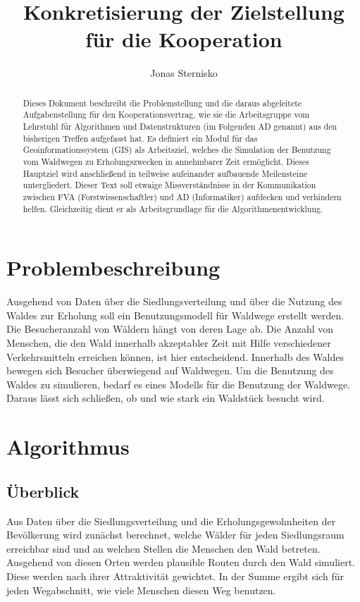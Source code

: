 \documentclass[parskip=half,german]{scrartcl}
\title{Konkretisierung der Zielstellung für die Kooperation}
\subtitle{}
\author{Jonas Sternisko}
\begin{document}
  \maketitle

  \begin{abstract}
Dieses Dokument beschreibt die Problemstellung und die daraus abgeleitete
Aufgabenstellung für den Kooperationsvertrag, wie sie die Arbeitsgruppe vom
Lehrstuhl für Algorithmen und Datenstrukturen (im Folgenden AD genannt) aus den
bisherigen Treffen aufgefasst hat. Es definiert ein Modul für das
Geoinformationssystem (GIS) als Arbeitsziel, welches die Simulation der
Benutzung vom Waldwegen zu Erholungszwecken in annehmbarer Zeit ermöglicht.
Dieses Hauptziel wird anschließend in teilweise aufeinander aufbauende
Meilensteine untergliedert.
Dieser Text soll etwaige Missverständnisse in der Kommunikation zwischen FVA
(Forstwissenschaftler) und AD (Informatiker) aufdecken und verhindern helfen.
Gleichzeitig dient er als Arbeitsgrundlage für die Algorithmenentwicklung.
  \end{abstract}

  
\section{Problembeschreibung}
Ausgehend von Daten über die Siedlungsverteilung und über die Nutzung des Waldes
zur Erholung soll ein Benutzungsmodell für Waldwege erstellt werden.
Die Besucheranzahl von Wäldern hängt von deren Lage ab. Die Anzahl von Menschen,
die den Wald innerhalb akzeptabler Zeit mit Hilfe verschiedener Verkehrsmitteln
erreichen können, ist hier entscheidend.
Innerhalb des Waldes bewegen sich Besucher überwiegend auf Waldwegen. Um die
Benutzung des Waldes zu simulieren, bedarf es eines Modells für die Benutzung
der Waldwege. Daraus lässt sich schließen, ob und wie stark ein Waldstück
besucht wird.

  
\section{Algorithmus}
\subsection{Überblick}
Aus Daten über die Siedlungsverteilung und die Erholungsgewohnheiten der
Bevölkerung wird zunächst berechnet, welche Wälder für jeden Siedlungsraum
erreichbar sind und an welchen Stellen die Menschen den Wald betreten.
Ausgehend von diesen Orten werden plausible Routen durch den Wald simuliert.
Diese werden nach ihrer Attraktivität gewichtet. In der Summe ergibt sich für
jeden Wegabschnitt, wie viele Menschen diesen Weg benutzen.
\end{document}

